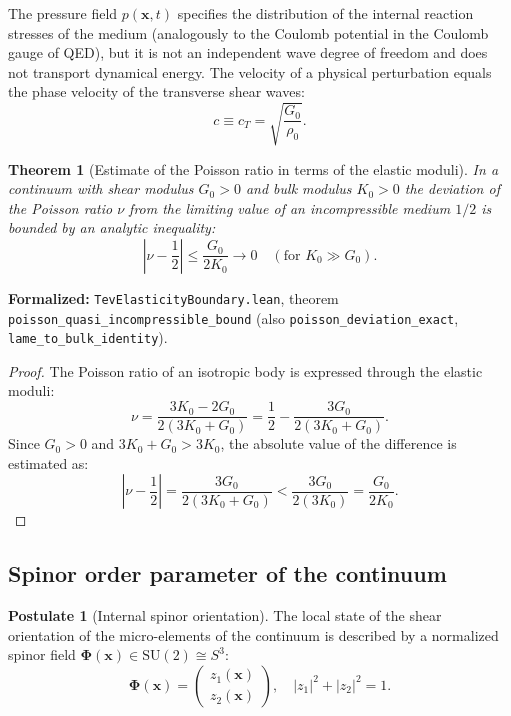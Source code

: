 \documentclass[11pt,a4paper]{article}
\newtheorem{theorem}{Theorem}
\theoremstyle{definition}
\newtheorem{postulate}{Postulate}
\theoremstyle{remark}
\begin{document}
The pressure field $p(\mathbf{x}, t)$ specifies the distribution of the internal reaction stresses of the medium (analogously to the Coulomb potential in the Coulomb gauge of QED), but it is not an independent wave degree of freedom and does not transport dynamical energy. The velocity of a physical perturbation equals the phase velocity of the transverse shear waves:
\begin{equation}
	c \equiv c_T = \sqrt{\frac{G_0}{\rho_0}}.
	\label{eq:speed_of_light_def}
\end{equation}
	
\begin{theorem}[Estimate of the Poisson ratio in terms of the elastic moduli]
\label{thm:poisson_bound_exact}
In a continuum with shear modulus $G_0 > 0$ and bulk modulus $K_0 > 0$ the deviation of the Poisson ratio $\nu$ from the limiting value of an incompressible medium $1/2$ is bounded by an analytic inequality:
\begin{equation}
	\left| \nu - \frac{1}{2} \right| \le \frac{G_0}{2 K_0} \to 0 \quad (\text{for } K_0 \gg G_0).
	\label{eq:poisson_bound_ineq}
\end{equation}
\end{theorem}

\noindent\small\textbf{Formalized:} \texttt{TevElasticityBoundary.lean}, theorem \texttt{poisson_quasi_incompressible_bound} (also \texttt{poisson_deviation_exact}, \texttt{lame_to_bulk_identity}).

\begin{proof}
The Poisson ratio of an isotropic body is expressed through the elastic moduli:
\begin{equation}
	\nu = \frac{3K_0 - 2G_0}{2(3K_0 + G_0)} = \frac{1}{2} - \frac{3G_0}{2(3K_0 + G_0)}.
\end{equation}
Since $G_0 > 0$ and $3K_0 + G_0 > 3K_0$, the absolute value of the difference is estimated as:
\begin{equation}
	\left| \nu - \frac{1}{2} \right| = \frac{3G_0}{2(3K_0 + G_0)} < \frac{3G_0}{2(3K_0)} = \frac{G_0}{2K_0}.
\end{equation}
\end{proof}
	
\subsection{Spinor order parameter of the continuum}
	
\begin{postulate}[Internal spinor orientation]
The local state of the shear orientation of the micro-elements of the continuum is described by a normalized spinor field $\boldsymbol{\Phi}(\mathbf{x}) \in \mathrm{SU}(2) \cong S^3$:
\begin{equation}
	\boldsymbol{\Phi}(\mathbf{x}) = \begin{pmatrix} z_1(\mathbf{x}) \\ z_2(\mathbf{x}) \end{pmatrix}, \quad |z_1|^2 + |z_2|^2 = 1.
	\label{eq:spinor_order_parameter}
\end{equation}
\end{postulate}
	
\end{document}
